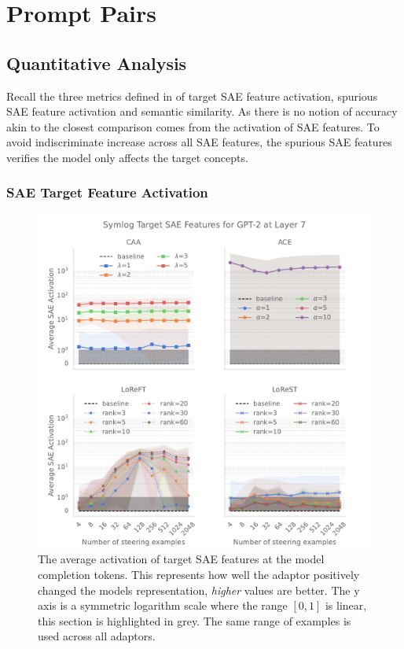 \section{Prompt Pairs}
\label{sec:prompt-pairs-res}

\subsection{Quantitative Analysis}
\label{sec:quant}

Recall the three metrics defined in  of target SAE feature activation, spurious SAE feature activation and semantic similarity.
As there is no notion of accuracy akin to \citet{steering-clear} the closest comparison comes from the activation of SAE features.
To avoid indiscriminate increase across all SAE features, the spurious SAE features verifies the model only affects the target concepts.

\subsubsection{SAE Target Feature Activation}

\begin{figure}
    \centering
    \captionsetup{width=\textwidth}
    \includegraphics[width=\textwidth]{figures/gpt2_7_target.pdf}
    \caption{
        The average activation of target SAE features at the model completion tokens.
        This represents how well the adaptor positively changed the models representation, \emph{higher} values are better.
        The y axis is a symmetric logarithm scale where the range $[0,1]$ is linear, this section is highlighted in grey.
        The same range of examples is used across all adaptors.
    }
    \label{fig:gpt-pp-target}
\end{figure}


